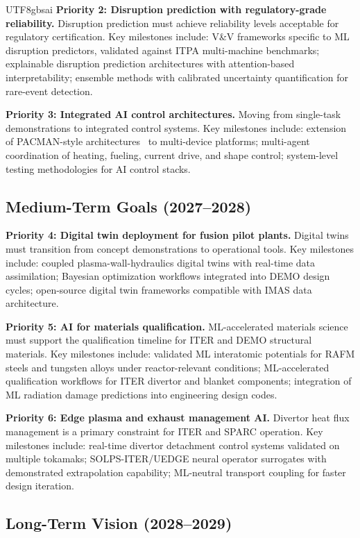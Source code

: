 \documentclass[12pt,a4paper]{article}
\begin{document}
\begin{CJK}{UTF8}{gbsai}
\textbf{Priority 2: Disruption prediction with regulatory-grade reliability.} Disruption prediction must achieve reliability levels acceptable for regulatory certification. Key milestones include: V\&V frameworks specific to ML disruption predictors, validated against ITPA multi-machine benchmarks; explainable disruption prediction architectures with attention-based interpretability; ensemble methods with calibrated uncertainty quantification for rare-event detection.

\textbf{Priority 3: Integrated AI control architectures.} Moving from single-task demonstrations to integrated control systems. Key milestones include: extension of PACMAN-style architectures~\citep{Rothstein2025PACMAN} to multi-device platforms; multi-agent coordination of heating, fueling, current drive, and shape control; system-level testing methodologies for AI control stacks.

\subsection{Medium-Term Goals (2027--2028)}

\textbf{Priority 4: Digital twin deployment for fusion pilot plants.} Digital twins must transition from concept demonstrations to operational tools. Key milestones include: coupled plasma-wall-hydraulics digital twins with real-time data assimilation; Bayesian optimization workflows integrated into DEMO design cycles; open-source digital twin frameworks compatible with IMAS data architecture.

\textbf{Priority 5: AI for materials qualification.} ML-accelerated materials science must support the qualification timeline for ITER and DEMO structural materials. Key milestones include: validated ML interatomic potentials for RAFM steels and tungsten alloys under reactor-relevant conditions; ML-accelerated qualification workflows for ITER divertor and blanket components; integration of ML radiation damage predictions into engineering design codes.

\textbf{Priority 6: Edge plasma and exhaust management AI.} Divertor heat flux management is a primary constraint for ITER and SPARC operation. Key milestones include: real-time divertor detachment control systems validated on multiple tokamaks; SOLPS-ITER/UEDGE neural operator surrogates with demonstrated extrapolation capability; ML-neutral transport coupling for faster design iteration.

\subsection{Long-Term Vision (2028--2029)}


\end{CJK}
\end{document}
